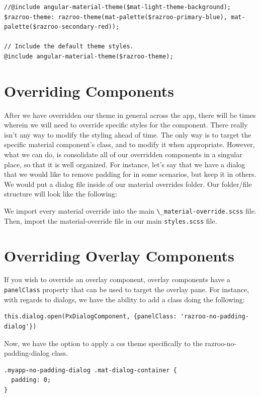 \begin{lstlisting}[caption=html and body override]
//@include angular-material-theme($mat-light-theme-background);
$razroo-theme: razroo-theme(mat-palette($razroo-primary-blue), mat-palette($razroo-secondary-red));

// Include the default theme styles.
@include angular-material-theme($razroo-theme);  
\end{lstlisting}

\section{Overriding Components}
After we have overridden our theme in general across the app, there will be 
times wherein we will need to override specific styles for the component. 
There really isn't any way to modify the styling ahead of time. The only way
is to target the specific material component's class, and to modify it when 
appropriate. However, what we can do, is consolidate all of our overridden
components in a singular place, so that it is well organized. For instance, 
let's say that we have a dialog that we would like to remove padding for 
in some scenarios, but keep it in others. We would put a dialog file inside of
our material overrides folder. Our folder/file structure will look like the
following: 



We import every material override into the main 
\lstinline{\_material-override.scss} file. Then, import the material-override 
file in our main \lstinline{styles.scss} file. 

\section{Overriding Overlay Components}
If you wish to override an overlay component, overlay components have a 
\lstinline{panelClass} property that can be used to target the overlay pane. 
For instance, with regards to dialogs, we have the ability to add a class doing
the following: 
\begin{lstlisting}
this.dialog.open(PxDialogComponent, {panelClass: 'razroo-no-padding-dialog'}) 
\end{lstlisting}

Now, we have the option to apply a css theme specifically to the 
razroo-no-padding-dialog class. 

\begin{lstlisting}
.myapp-no-padding-dialog .mat-dialog-container {
  padding: 0;
}
\end{lstlisting}

